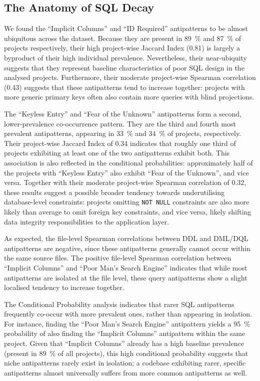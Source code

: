 \subsection{The Anatomy of SQL Decay}\label{sec:anatomy}

We found the “Implicit Columns” and “ID Required” antipatterns to be almost ubiquitous across the dataset. Because they are present in \qty{89}{\percent} and \qty{87}{\percent} of projects respectively, their high project-wise Jaccard Index (\num{0.81}) is largely a byproduct of their high individual prevalence. Nevertheless, their near-ubiquity suggests that they represent baseline characteristics of poor SQL design in the analysed projects. Furthermore, their moderate project-wise Spearman correlation (\num{0.43}) suggests that these antipatterns tend to increase together: projects with more generic primary keys often also contain more queries with blind projections.

The “Keyless Entry” and “Fear of the Unknown” antipatterns form a second, lower-prevalence co-occurrence pattern. They are the third and fourth most prevalent antipatterns, appearing in \qty{33}{\percent} and \qty{34}{\percent} of projects, respectively. Their project-wise Jaccard Index of \num{0.34} indicates that roughly one third of projects exhibiting at least one of the two antipatterns exhibit both. This association is also reflected in the conditional probabilities: approximately half of the projects with “Keyless Entry” also exhibit “Fear of the Unknown”, and vice versa. Together with their moderate project-wise Spearman correlation of \num{0.32}, these results suggest a possible broader tendency towards underutilising database-level constraints: projects omitting \texttt{NOT NULL} constraints are also more likely than average to omit foreign key constraints, and vice versa, likely shifting data integrity responsibilities to the application layer.

As expected, the file-level Spearman correlations between DDL and DML/DQL antipatterns are negative, since these antipatterns generally cannot occur within the same source files. The positive file-level Spearman correlation between “Implicit Columns” and “Poor Man's Search Engine” indicates that while most antipatterns are isolated at the file level, these query antipatterns show a slight localised tendency to increase together.

The Conditional Probability analysis indicates that rarer SQL antipatterns frequently co-occur with more prevalent ones, rather than appearing in isolation. For instance, finding the “Poor Man's Search Engine” antipattern yields a \qty{95}{\percent} probability of also finding the “Implicit Columns” antipattern within the same project. Given that “Implicit Columns” already has a high baseline prevalence (present in \qty{89}{\percent} of all projects), this high conditional probability suggests that niche antipatterns rarely exist in isolation; a codebase exhibiting rarer, specific antipatterns almost universally suffers from more common antipatterns as well.

